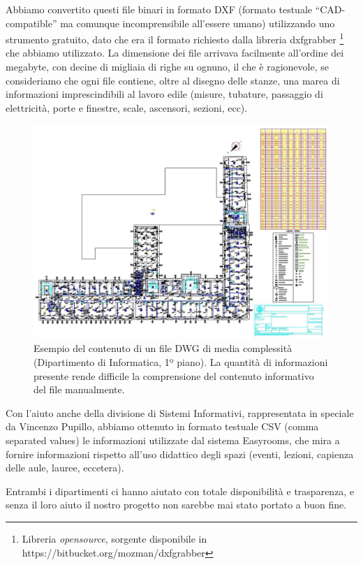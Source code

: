 \documentclass[12pt]{report}
\begin{document}
Abbiamo convertito questi file binari in formato DXF (formato testuale ``CAD-compatible'' ma comunque incomprensibile all'essere umano) utilizzando uno strumento gratuito, dato che era il formato richiesto dalla libreria dxfgrabber \footnote{Libreria \textit{opensource}, sorgente disponibile in https://bitbucket.org/mozman/dxfgrabber} che abbiamo utilizzato. La dimensione dei file arrivava facilmente all'ordine dei megabyte, con decine di migliaia di righe su ognuno, il che è ragionevole, se consideriamo che ogni file contiene, oltre al disegno delle stanze, una marea di informazioni imprescindibili al lavoro edile (misure, tubature, passaggio di elettricità, porte e finestre, scale, ascensori, sezioni, ecc).

\begin{figure}[h]
    \centering
    \includegraphics[width=\textwidth]{03-dxf-chaos.jpg}
    \caption{Esempio del contenuto di un file DWG di media complessità (Dipartimento di Informatica, 1º piano). La quantità di informazioni presente rende difficile la comprensione del contenuto informativo del file manualmente. }
    \label{fig:dxf_chaos}
\end{figure}

Con l'aiuto anche della divisione di Sistemi Informativi, rappresentata in speciale da Vincenzo Pupillo, abbiamo ottenuto in formato testuale CSV (comma separated values) le informazioni utilizzate dal sistema Easyrooms, che mira a fornire informazioni rispetto all'uso didattico degli spazi (eventi, lezioni, capienza delle aule, lauree, eccetera).

Entrambi i dipartimenti ci hanno aiutato con totale disponibilità e trasparenza, e senza il loro aiuto il nostro progetto non sarebbe mai stato portato a buon fine.
\end{document}
